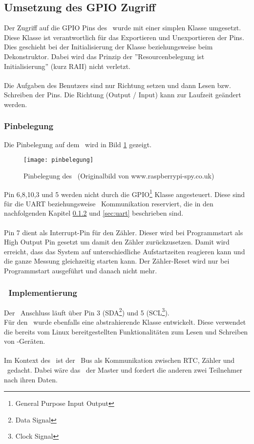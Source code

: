 \subsection{Umsetzung des GPIO Zugriff}
Der Zugriff auf die GPIO Pins des \rpi\ wurde mit einer simplen Klasse umgesetzt. Diese Klasse ist verantwortlich für das Exportieren und Unexportieren der Pins.
Dies geschieht bei der Initialisierung der Klasse beziehungsweise beim Dekonstruktor. Dabei wird das Prinzip der ''Resourcenbelegung ist Initialisierung'' (kurz RAII) nicht verletzt.\\
\\
Die Aufgaben des Benutzers sind nur Richtung setzen und dann Lesen bzw. Schreiben der Pins. Die Richtung (Output / Input) kann zur Laufzeit geändert werden.

\subsubsection{Pinbelegung}
Die Pinbelegung auf dem \rpi\ wird in Bild \ref{fig:pi_belegung} gezeigt.
\begin{figure}[H]
    \centering
    \texttt{[image: pinbelegung]}
    \caption{Pinbelegung des \rpi\ (Originalbild von www.raspberrypi-spy.co.uk)}
    \label{fig:pi_belegung}
\end{figure}

\noindent Pin 6,8,10,3 und 5 werden nicht durch die GPIO\footnote{General Purpose Input Output} Klasse angesteuert. Diese sind für die UART beziehungsweise \iic\ Kommunikation reserviert, die in den nachfolgenden Kapitel \ref{sec:i2c} und \ref{sec:uart} beschrieben sind.\\\\
Pin 7 dient als Interrupt-Pin für den Zähler. Dieser wird bei Programmstart als High Output Pin gesetzt um damit den Zähler zurückzusetzen. Damit wird erreicht, dass das System auf unterschiedliche Aufstartzeiten reagieren kann und die ganze Messung gleichzeitig starten kann. Der Zähler-Reset wird nur bei Programmstart ausgeführt und danach nicht mehr.

\subsubsection{\iic\ Implementierung}\label{sec:i2c}
Der \iic\ Anschluss läuft über Pin 3 (SDA\footnote{Data Signal}) und 5 (SCL\footnote{Clock Signal}).\\
Für den \iic\ wurde ebenfalls eine abstrahierende Klasse entwickelt. Diese verwendet die bereits vom Linux bereitgestellten Funktionalitäten zum Lesen und Schreiben von \iic-Geräten.\\
\\
Im Kontext des \documenttitle\ ist der \iic\ Bus als Kommunikation zwischen RTC, Zähler und \rpi\ gedacht. 
Dabei wäre das \rpi\ der Master und fordert die anderen zwei Teilnehmer nach ihren Daten.

